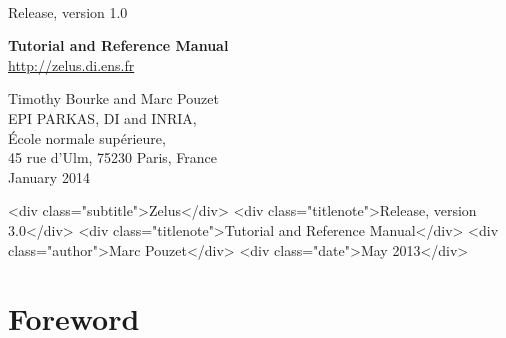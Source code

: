 \documentclass[11pt,titlepage,twoside]{report}
\begin{document}
\pagestyle{empty}

\begin{latexonly}
\vfill

 \\[2ex]
{\Large Release, version 1.0}


\vspace{7cm}

\begin{center}
{\Huge \bf Tutorial and Reference Manual} \\

\vspace{1cm}
{\Large \url{http://zelus.di.ens.fr}}
\vspace{1.5cm}

{\Large Timothy Bourke and Marc Pouzet} \\[2ex]
{\large EPI PARKAS, DI and INRIA, \\
\'Ecole normale sup\'erieure, \\ 45 rue d'Ulm,
75230 Paris, France} \\[2ex]
{\Large January 2014} \\

\end{center}
\end{latexonly}
\begin{rawhtml}
  <div class="subtitle">Zelus</div>
  <div class="titlenote">Release, version 3.0</div>
  <div class="titlenote">Tutorial and Reference Manual</div>
  <div class="author">Marc Pouzet</div>
  <div class="date">May 2013</div>
\end{rawhtml}


\newpage
\cleardoublepage
\tableofcontents
\cleardoublepage

\chapter*{Foreword}
\end{document}
